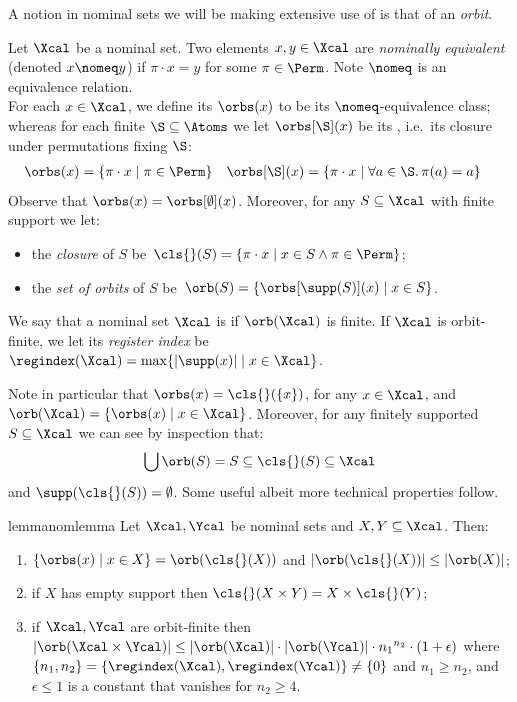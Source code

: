 A notion in nominal sets we will be making extensive use of is that of an \emph{orbit}.

\begin{definition}
    Let $\Xcal$ be a nominal set. 
    Two elements $x, y\in \Xcal$ are \emph{nominally equivalent} (denoted $x \nomeq y$) if $\pi \cdot x = y$ for some $\pi\in\Perm$. Note $\nomeq$ is an equivalence relation.
    \\
For each $x \in \Xcal$, we define its  $\orbs(x)$ to be its $\nomeq$-equivalence class; whereas for each finite $\S\subseteq\Atoms$ we let $\orbs[\S](x)$ be its , i.e.\ its closure under permutations fixing $\S$:
    \begin{align*}
        \orbs(x) &= \{\pi \cdot x \mid \pi \in \Perm\} &
    \orbs[\S](x) &= \{\pi \cdot x \mid \forall a\in\S.\,\pi(a)=a\}
    \end{align*}
    Observe that $\orbs(x)=\orbs[\emptyset](x)$.
    Moreover, for any $S\subseteq \Xcal$ with finite support we let:
    \begin{itemize}
    \item
the {\em closure} of $S$ be\
        $\cls{}(S) = \{\pi\cdot x\mid x\in S\land\pi\in\Perm\}$;
      \item the \emph{set of orbits} of $S$ be\
   $
        \orb(S) = \{ \orbs[\supp(S)](x) \mid x \in S\}
    $.
      \end{itemize}
We say that a nominal set $\Xcal$ is  if $\orb(\Xcal)$ is finite.
If $\Xcal$ is orbit-finite, we let its \emph{register index} be\
    $
        \regindex(\Xcal) = \max\{|\supp(x)| \mid x \in \Xcal\}
        $.
\end{definition}

Note in particular that
$\orbs(x)=\cls{}(\{x\})$, for any $x\in\Xcal$, and
$\orb(\Xcal) = \{ \orbs(x) \mid x \in \Xcal\}$.
Moreover, for any finitely supported $S\subseteq\Xcal$ we can see by inspection that:
\[\bigcup\orb(S)=S\subseteq\cls{}(S)\subseteq\Xcal
  \]
and $\supp(\cls{}(S))=\emptyset$. Some useful albeit more technical properties follow.

\begin{restatable}{lemma}{nomlemma}\label{lem:nomlemma}
	Let $\Xcal,\Ycal$ be nominal sets and $X,Y \subseteq \Xcal$. 
	Then:
	\begin{enumerate}
		\item\label{nomlemma:orbs} $\{\orbs(x) \mid x \in X\} = \orb(\cls{}(X))$ and $|\orb(\cls{}(X))| \le |\orb(X)|$;
		\item\label{nomlemma:cls} if $X$ has empty support then $\cls{}(X \times Y) = X \times \cls{}(Y)$;
		\item\label{nomlemma:prod} if $\Xcal,\Ycal$ are orbit-finite then
		$|\orb(\Xcal \times \Ycal)| \le |\orb(\Xcal)|\cdot|\orb(\Ycal)|\cdot {n_1}^{n_2}\cdot(1 + \epsilon)$ where $\{n_1,n_2\}=\{\regindex(\Xcal), \regindex(\Ycal)\}\neq\{0\}$ and $n_1\geq n_2$,
		and $\epsilon\leq 1$ is a constant that vanishes for $n_2\geq 4$. 
	\end{enumerate}
\end{restatable}
\vspace{1em}



